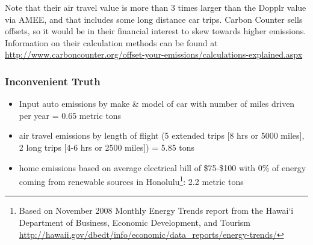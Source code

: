 Note that their air travel \COtwo value is more than 3 times larger than the Dopplr value via AMEE, and that includes some long distance car trips. Carbon Counter sells offsets, so it would be in their financial interest to skew towards higher emissions. Information on their calculation methods can be found at \url{http://www.carboncounter.org/offset-your-emissions/calculations-explained.aspx}

\subsubsection{Inconvenient Truth}
\begin{itemize}
	\item Input auto emissions by make \& model of car with number of miles driven per year = 0.65 metric tons \COtwo
	\item air travel emissions by length of flight (5 extended trips [8 hrs or 5000 miles], 2 long trips [4-6 hrs or 2500 miles]) = 5.85 tons \COtwo
	\item home emissions based on average electrical bill of \$75-\$100 with 0\% of energy coming from renewable sources in Honolulu\footnote{Based on November 2008 Monthly Energy Trends report from the Hawai`i Department of Business, Economic Development, and Tourism \url{http://hawaii.gov/dbedt/info/economic/data_reports/energy-trends/}}: 2.2 metric tons \COtwo
\end{itemize}